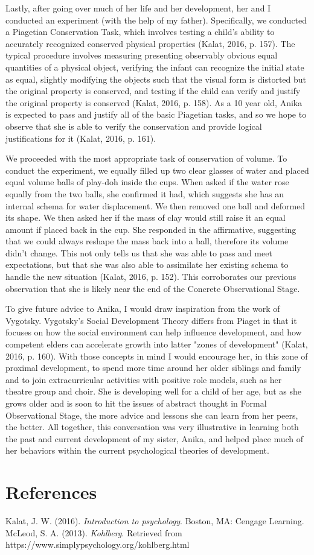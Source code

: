\documentclass[a4paper, 10pt]{article}
\begin{document}
	Lastly, after going over much of her life and her development, her and I conducted an experiment (with the help of my father). Specifically, we conducted a Piagetian Conservation Task, which involves testing a child's ability to accurately recognized conserved physical properties (Kalat, 2016, p. 157). The typical procedure involves measuring presenting observably obvious equal quantities of a physical object, verifying the infant can recognize the initial state as equal, slightly modifying the objects such that the visual form is distorted but the original property is conserved, and testing if the child can verify and justify the original property is conserved (Kalat, 2016, p. 158). As a 10 year old, Anika is expected to pass and justify all of the basic Piagetian tasks, and so we hope to observe that she is able to verify the conservation and provide logical justifications for it (Kalat, 2016, p. 161). 

We proceeded with the most appropriate task of conservation of volume. To conduct the experiment, we equally filled up two clear glasses of water and placed equal volume balls of play-doh inside the cups. When asked if the water rose equally from the two balls, she confirmed it had, which suggests she has an internal schema for water displacement. We then removed one ball and deformed its shape. We then asked her if the mass of clay would still raise it an equal amount if placed back in the cup. She responded in the affirmative, suggesting that we could always reshape the mass back into a ball, therefore its volume didn't change. This not only tells us that she was able to pass and meet expectations, but that she was also able to assimilate her existing schema to handle the new situation (Kalat, 2016, p. 152). This corroborates our previous observation that she is likely near the end of the Concrete Observational Stage.

To give future advice to Anika, I would draw inspiration from the work of Vygotsky. Vygotsky's Social Development Theory differs from Piaget in that it focuses on how the social environment can help influence development, and how competent elders can accelerate growth into latter "zones of development" (Kalat, 2016, p. 160). With those concepts in mind I would encourage her, in this zone of proximal development, to spend more time around her older siblings and family and to join extracurricular activities with positive role models, such as her theatre group and choir. She is developing well for a child of her age, but as she grows older and is soon to hit the issues of abstract thought in Formal Observational Stage, the more advice and lessons she can learn from her peers, the better.
All together, this conversation was very illustrative in learning both the past and current development of my sister, Anika, and helped place much of her behaviors within the current psychological theories of development.

\newpage
\section*{References}

Kalat, J. W. (2016). \textit{Introduction to psychology}. Boston, MA: Cengage Learning.
\\
McLeod, S. A. (2013). \textit{Kohlberg}. Retrieved from https://www.simplypsychology.org/kohlberg.html
\end{document}
